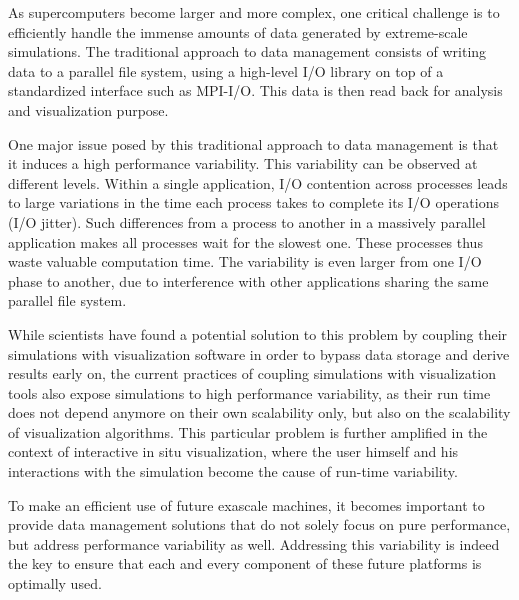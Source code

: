 As supercomputers become larger and more complex, one critical challenge is to efficiently handle the immense amounts of data generated by extreme-scale simulations. The traditional approach to data management consists of writing data to a parallel file system, using a high-level I/O library on top of a standardized interface such as MPI-I/O. This data is then read back for analysis and visualization purpose.

One major issue posed by this traditional approach to data management is that it induces a high performance variability. This variability can be observed at different levels. Within a single application, I/O contention across processes leads to large variations in the time each process takes to complete its I/O operations (I/O jitter). Such differences from a process to another in a massively parallel application makes all processes wait for the slowest one. These processes thus waste valuable computation time. The variability is even larger from one I/O phase to another, due to interference with other applications sharing the same parallel file system. 

While scientists have found a potential solution to this problem by coupling their simulations with visualization software in order to bypass data storage and derive results early on, the current practices of coupling simulations with visualization tools also expose simulations to high performance variability, as their run time does not depend anymore on their own scalability only, but also on the scalability of visualization algorithms. This particular problem is further amplified in the context of interactive in situ visualization, where the user himself and his interactions with the simulation become the cause of run-time variability. 

To make an efficient use of future exascale machines, it becomes important to provide data management solutions that do not solely focus on pure performance, but address performance variability as well. Addressing this variability is indeed the key to ensure that each and every component of these future platforms is optimally used.

